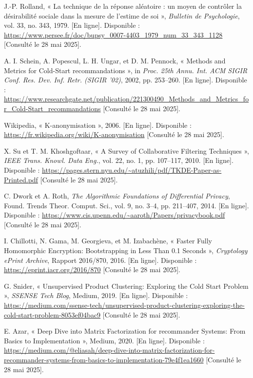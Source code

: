 \documentclass{article}
\begin{document}
\newpage
\begin{thebibliography}{99}

    J.-P. Rolland, « La technique de la réponse aléatoire : un moyen de contrôler la désirabilité sociale dans la mesure de l'estime de soi », \emph{Bulletin de Psychologie}, vol. 33, no. 343, 1979. [En ligne]. Disponible : \url{https://www.persee.fr/doc/bupsy_0007-4403_1979_num_33_343_1128} [Consulté le 28 mai 2025].

    A. I. Schein, A. Popescul, L. H. Ungar, et D. M. Pennock, « Methods and Metrics for Cold-Start recommandations », in \emph{Proc. 25th Annu. Int. ACM SIGIR Conf. Res. Dev. Inf. Retr. (SIGIR '02)}, 2002, pp. 253–260. [En ligne]. Disponible : \url{https://www.researchgate.net/publication/221300490_Methods_and_Metrics_for_Cold-Start_recommandations} [Consulté le 28 mai 2025].

    Wikipedia, « K-anonymisation », 2006. [En ligne]. Disponible : \url{https://fr.wikipedia.org/wiki/K-anonymisation} [Consulté le 28 mai 2025].

    X. Su et T. M. Khoshgoftaar, « A Survey of Collaborative Filtering Techniques », \emph{IEEE Trans. Knowl. Data Eng.}, vol. 22, no. 1, pp. 107–117, 2010. [En ligne]. Disponible : \url{https://pages.stern.nyu.edu/~atuzhili/pdf/TKDE-Paper-as-Printed.pdf} [Consulté le 28 mai 2025].

    C. Dwork et A. Roth, \emph{The Algorithmic Foundations of Differential Privacy}, Found. Trends Theor. Comput. Sci., vol. 9, no. 3–4, pp. 211–407, 2014. [En ligne]. Disponible : \url{https://www.cis.upenn.edu/~aaroth/Papers/privacybook.pdf} [Consulté le 28 mai 2025].

    I. Chillotti, N. Gama, M. Georgieva, et M. Izabachène, « Faster Fully Homomorphic Encryption: Bootstrapping in Less Than 0.1 Seconds », \emph{Cryptology ePrint Archive}, Rapport 2016/870, 2016. [En ligne]. Disponible : \url{https://eprint.iacr.org/2016/870} [Consulté le 28 mai 2025].

    G. Snider, « Unsupervised Product Clustering: Exploring the Cold Start Problem », \emph{SSENSE Tech Blog}, Medium, 2019. [En ligne]. Disponible : \url{https://medium.com/ssense-tech/unsupervised-product-clustering-exploring-the-cold-start-problem-8053ef04bac9} [Consulté le 28 mai 2025].

    E. Azar, « Deep Dive into Matrix Factorization for recommander Systems: From Basics to Implementation », Medium, 2020. [En ligne]. Disponible : \url{https://medium.com/@eliasah/deep-dive-into-matrix-factorization-for-recommander-systems-from-basics-to-implementation-79e4f1ea1660} [Consulté le 28 mai 2025].


\end{thebibliography}
\end{document}
